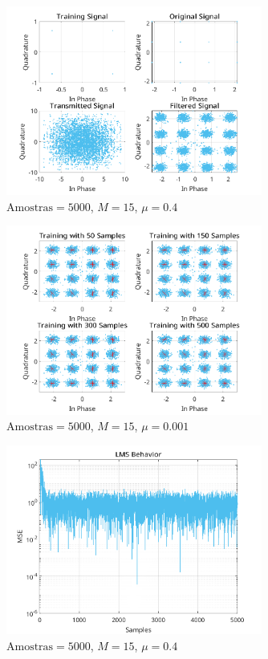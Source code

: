 \documentclass[a4paper,10pt]{article}
\begin{document}
\begin{enumerate}
				\begin{figure}[!ht]
					\centering
					\includegraphics[width=0.75\textwidth]{figs/L3Q6_A_t.png}
					\caption{$\text{Amostras} = 5000$, $M = 15$, $\mu = 0.4$}
					\label{fig:L3Q6A2}
				\end{figure}

				\begin{figure}[!ht]
					\centering
					\includegraphics[width=0.75\textwidth]{figs/L3Q6_B_t.png}
					\caption{$\text{Amostras} = 5000$, $M = 15$, $\mu = 0.001$}
					\label{fig:L3Q6B}
				\end{figure}

				\begin{figure}[!ht]
					\centering
					\includegraphics[width=0.75\textwidth]{figs/L3Q6_C_mse.png}
					\caption{$\text{Amostras} = 5000$, $M = 15$, $\mu = 0.4$}
					\label{fig:L3Q6C1}
				\end{figure}


\end{enumerate}
\end{document}
